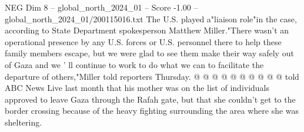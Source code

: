 \begin{textsample}{NEG Dim 8 – global\_north\_2024\_01 – Score -1.00 – global\_north\_2024\_01/200115016.txt}
The U.S. played a"liaison role"in the case, according to State Department spokesperson Matthew Miller."There wasn't an operational presence by any U.S. forces or U.S. personnel there to help these family members escape, but we were glad to see them make their way safely out of Gaza and we ' ll continue to work to do what we can to facilitate the departure of others,"Miller told reporters Thursday. @ @ @ @ @ @ @ @ @ @ told ABC News Live last month that his mother was on the list of individuals approved to leave Gaza through the Rafah gate, but that she couldn't get to the border crossing because of the heavy fighting surrounding the area where she was sheltering.

\end{textsample}
